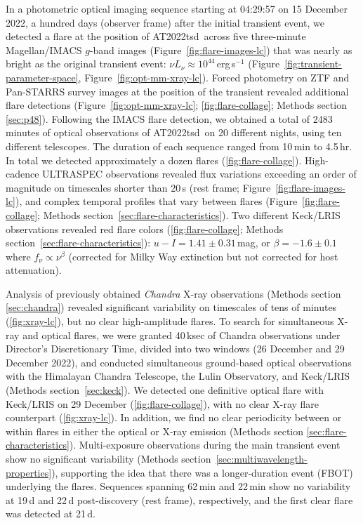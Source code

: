 \documentclass{nature_plusfigure}
\newcommand{\at}{AT2022tsd}
\begin{document}
In a photometric optical imaging sequence starting at 04:29:57 on 15 December 2022, a hundred days (observer frame) after the initial transient event, we detected\cite{Ho2022_Astronote_Flares} a flare at the position of \at\ across five three-minute Magellan/IMACS $g$-band images (Figure~\ref{fig:flare-images-lc}) that was nearly as bright as the original transient event: $\nu L_\nu \approx 10^{44}\,$erg\,s$^{-1}$ (Figure~\ref{fig:transient-parameter-space}, Figure~\ref{fig:opt-mm-xray-lc}).
Forced photometry on ZTF and Pan-STARRS survey\cite{Tonry2012,Chambers2016} images at the position of the transient revealed additional flare detections (Figure~\ref{fig:opt-mm-xray-lc}; \ref{fig:flare-collage}; Methods section \ref{sec:p48}).
Following the IMACS flare detection, we obtained a total of 2483 minutes of optical observations of \at\ on 20 different nights, using ten different telescopes. The duration of each sequence ranged from 10\,min to 4.5\,hr. In total we detected approximately a dozen flares (\ref{fig:flare-collage}). High-cadence ULTRASPEC\cite{Dhillon2014} observations revealed flux variations exceeding an order of magnitude on timescales shorter than 20\,s (rest frame; Figure~\ref{fig:flare-images-lc}), and complex temporal profiles that vary between flares (Figure~\ref{fig:flare-collage}; Methods section~\ref{sec:flare-characteristics}).
Two different Keck/LRIS observations revealed red flare colors (\ref{fig:flare-collage}; Methods section~\ref{sec:flare-characteristics}):
$u-I=1.41\pm0.31\,$mag, or $\beta=-1.6\pm0.1$ where
$f_\nu \propto \nu^{\beta}$ (corrected for Milky Way extinction but not corrected for host attenuation).

Analysis of previously obtained \emph{Chandra} X-ray observations\cite{Matthews2022} (Methods section \ref{sec:chandra}) revealed significant variability on timescales of tens of minutes (\ref{fig:xray-lc}), but no clear high-amplitude flares. To search for simultaneous X-ray and optical flares,
we were granted 40\,ksec of Chandra observations under Director's Discretionary Time, divided into two windows (26 December and 29 December 2022),
and conducted simultaneous ground-based optical observations with the Himalayan Chandra Telescope, the Lulin Observatory, and Keck/LRIS (Methods section~\ref{sec:keck}). We detected one definitive optical flare with Keck/LRIS on 29 December (\ref{fig:flare-collage}), with no clear X-ray flare counterpart (\ref{fig:xray-lc}).
In addition, we find no clear periodicity between or within flares in either the optical or X-ray emission (Methods section \ref{sec:flare-characteristics}).
Multi-exposure observations during the main transient event show no significant variability (Methods section~\ref{sec:multiwavelength-properties}), supporting the idea that there was a longer-duration event (FBOT) underlying the flares.
Sequences spanning 62\,min and 22\,min show no variability at 19\,d and 22\,d post-discovery (rest frame), respectively, and the first clear flare was detected at 21\,d.
\end{document}
